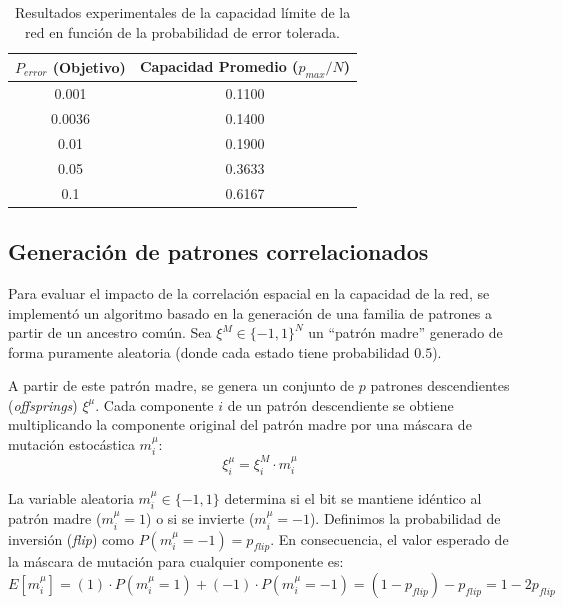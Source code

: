 \begin{table}[htbp]
	\centering
	\begin{tabular}{cc}
		\toprule
		\textbf{$P_{error}$ (Objetivo)} & \textbf{Capacidad Promedio ($p_{max}/N$)} \\
		\midrule
		0.001  & 0.1100 \\
		0.0036 & 0.1400 \\
		0.01   & 0.1900 \\
		0.05   & 0.3633 \\
		0.1    & 0.6167 \\
		\bottomrule
	\end{tabular}
	\caption{Resultados experimentales de la capacidad límite de la red en función de la probabilidad de error tolerada.}
	\label{tab:resultados_ej2}
\end{table}

\subsection{Generación de patrones correlacionados}
\label{subsec:patrones_correlacionados}

Para evaluar el impacto de la correlación espacial en la capacidad de la red, se implementó un algoritmo basado en la generación de una familia de patrones a partir de un ancestro común. Sea $\xi^M \in \{-1, 1\}^N$ un ``patrón madre'' generado de forma puramente aleatoria (donde cada estado tiene probabilidad $0.5$). 

A partir de este patrón madre, se genera un conjunto de $p$ patrones descendientes (\textit{offsprings}) $\xi^\mu$. Cada componente $i$ de un patrón descendiente se obtiene multiplicando la componente original del patrón madre por una máscara de mutación estocástica $m_i^\mu$:
\begin{equation}
	\xi_i^\mu = \xi_i^M \cdot m_i^\mu
\end{equation}

La variable aleatoria $m_i^\mu \in \{-1, 1\}$ determina si el bit se mantiene idéntico al patrón madre ($m_i^\mu = 1$) o si se invierte ($m_i^\mu = -1$). Definimos la probabilidad de inversión (\textit{flip}) como $P(m_i^\mu = -1) = p_{flip}$. En consecuencia, el valor esperado de la máscara de mutación para cualquier componente es:
\begin{equation}
	E[m_i^\mu] = (1) \cdot P(m_i^\mu = 1) + (-1) \cdot P(m_i^\mu = -1) = (1 - p_{flip}) - p_{flip} = 1 - 2p_{flip}
\end{equation}

